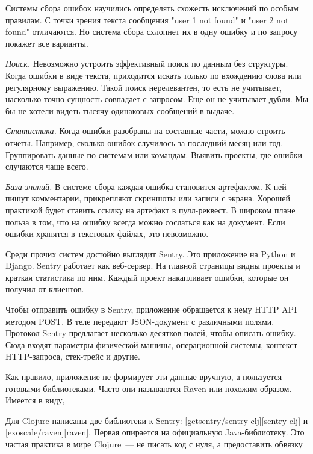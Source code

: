 Системы сбора ошибок научились определять схожесть исключений по особым
правилам. С точки зрения текста сообщения "user 1 not found" и "user 2 not
found" отличаются. Но система сбора схлопнет их в одну ошибку и по запросу
покажет все варианты.

\emph{Поиск.} Невозможно устроить эффективный поиск по данным без структуры. Когда
ошибки в виде текста, приходится искать только по вхождению слова или
регулярному выражению. Такой поиск нерелевантен, то есть не учитывает, насколько
точно сущность совпадает с запросом. Еще он не учитывает дубли. Мы бы не хотели
видеть тысячу одинаковых сообщений в выдаче.

\emph{Статистика.} Когда ошибки разобраны на составные части, можно строить
отчеты. Например, сколько ошибок случилось за последний месяц или
год. Группировать данные по системам или командам. Выявить проекты, где ошибки
случаются чаще всего.

\emph{База знаний.} В системе сбора каждая ошибка становится артефактом. К ней
пишут комментарии, прикрепляют скриншоты или записи с экрана. Хорошей практикой
будет ставить ссылку на артефакт в пулл-реквест. В широком плане польза в том,
что на ошибку всегда можно сослаться как на документ. Если ошибки хранятся в
текстовых файлах, это невозможно.

Среди прочих систем достойно выглядит Sentry. Это приложение на Python и
Django. Sentry работает как веб-сервер. На главной страницы видны проекты и
краткая статистика по ним. Каждый проект накапливает ошибки, которые он получил
от клиентов.

Чтобы отправить ошибку в Sentry, приложение обращается к нему HTTP API методом
POST. В теле передают JSON-документ с различными полями. Протокол Sentry
предлагает несколько десятков полей, чтобы описать ошибку. Сюда входят параметры
физической машины, операционной системы, контекст HTTP-запроса, стек-трейс и
другие.

Как правило, приложение не формирует эти данные вручную, а пользуется готовыми
библиотеками. Часто они называются Raven или похожим образом. Имеется в виду,


Для Clojure написаны две библиотеки к Sentry: [getsentry/sentry-clj][sentry-clj]
и [exoscale/raven][raven]. Первая опирается на официальную Java-библиотеку. Это
частая практика в мире Clojure~--- не писать код с нуля, а предоставить обвязку

